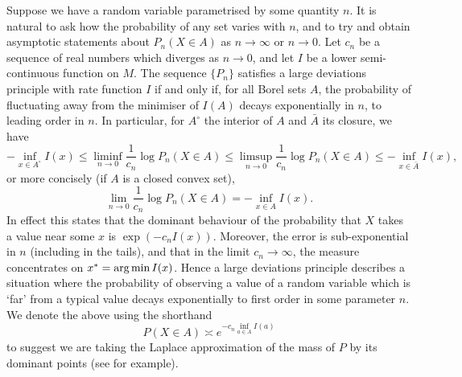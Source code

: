 \documentclass[11pt]{amsart}
\numberwithin{equation}{section}
\theoremstyle{remark}
\theoremstyle{remark}
\DeclareMathOperator*{\argmin}{\text{arg\,min}}
\begin{document}
Suppose we have a random variable parametrised by some quantity $n$. It is natural to ask how the probability of any set varies with $n$, and to try and obtain asymptotic statements about $P_n(X \in A)$ as $n \to \infty$ or $n \to 0$. Let $c_n$ be a sequence of real numbers which diverges as $n\to 0$, and let $I$ be a lower semi-continuous function on $M$. The sequence $\{P_n\}$ satisfies a large deviations principle with rate function $I$ if and only if, for all Borel sets $A$, the probability of fluctuating away from the minimiser of $I(A)$ decays exponentially in $n$, to leading order in $n$. In particular, for $A^\circ$ the interior of $A$ and $\bar{A}$ its closure, we have
\[
    - \inf_{x \in A^\circ} I(x) \leqslant \liminf_{n\to0} \frac{1}{c_n} \log P_n(X \in A) \leqslant \limsup_{n\to0} \frac{1}{c_n} \log P_n(X \in A) \leqslant -\inf_{x\in\bar{A}} I(x),
\]
or more concisely (if $A$ is a closed convex set), 
\[
    \lim_{n\to0} \frac{1}{c_n} \log P_n(X \in A) = - \inf_{x\in A} I(x).
\]
In effect this states that the dominant behaviour of the probability that $X$ takes a value near some $x$ is $\exp(-c_n I(x))$. Moreover, the error is sub-exponential in $n$ (including in the tails), and that in the limit $c_n \to \infty$, the measure concentrates on $x^* = \argmin I(x)$. Hence a large deviations principle describes a situation where the probability of observing a value of a random variable which is `far' from a typical value decays exponentially to first order in some parameter $n$. We denote the above using the shorthand
\[
    P(X \in A) \asymp e^{-c_n \inf_{a \in A} I(a)}
\]
to suggest we are taking the Laplace approximation of the mass of $P$ by its dominant points (see \cite[\S E7]{touchette2009large} for example). 
\end{document}
